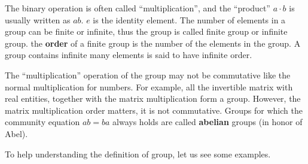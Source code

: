 \documentclass{article}
\begin{document}
The binary operation is often called ``multiplication'', and the ``product'' $a \cdot b$ is usually written as $ab$. $e$ is the identity element. The number of elements in a group can be finite or infinite, thus the group is called finite group or infinite group. the \textbf{order} of a finite group is the number of the elements in the group. A group contains infinite many elements is said to have infinite order.

The ``multiplication'' operation of the group may not be commutative like the normal multiplication for numbers. For example, all the invertible matrix with real entities, together with the matrix multiplication form a group. However, the matrix multiplication order matters, it is not commutative. Groups for which the community equation $ab = ba$ always holds are called \textbf{abelian} groups (in honor of Abel).

To help understanding the definition of group, let us see some examples.
\end{document}
